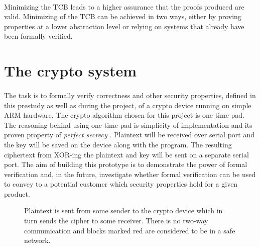 \documentclass[fleqn]{kththesis}
\begin{document}
\paragraph{}
Minimizing the TCB leads to a higher assurance that the proofs produced are valid. Minimizing of the TCB can be achieved in two ways, either by proving properties at a lower abstraction level or relying on systems that already have been formally verified. 

\section{The crypto system}
\paragraph{}
The task is to formally verify correctness and other security properties, defined in this prestudy as well as during the project, of a crypto device running on simple ARM hardware. The crypto algorithm chosen for this project is one time pad. The reasoning behind using one time pad is simplicity of implementation and its proven property of \emph{perfect secrecy} \parencite{shannon_otp}. Plaintext will be received over serial port and the key will be saved on the device along with the program. The resulting ciphertext from XOR-ing the plaintext and key will be sent on a separate serial port. The aim of building this prototype is to demonstrate the power of formal verification and, in the future, investigate whether formal verification can be used to convey to a potential customer which security properties hold for a given product. 

\begin{figure}[!h]
\centering
\caption{Plaintext is sent from some sender to the crypto device which in turn sends the cipher to some receiver. There is no two-way communication and blocks marked red are considered to be in a safe network.}
\label{overview}
\end{figure}
\end{document}
